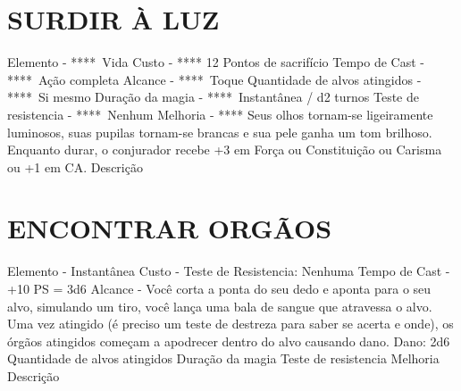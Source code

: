 \documentclass{article}%
\begin{document}
%
\section{SURDIR À LUZ}%
\label{sec:SURDIRLUZ}%
Elemento {-} ****~Vida\newline%
Custo {-} **** 12 Pontos de sacrifício\newline%
Tempo de Cast {-} ****~Ação completa\newline%
Alcance {-} ****~Toque\newline%
Quantidade de alvos atingidos {-} ****~Si mesmo\newline%
Duração da magia {-} ****~Instantânea / d2 turnos\newline%
Teste de resistencia {-} ****~Nenhum\newline%
Melhoria {-} **** Seus olhos tornam{-}se ligeiramente luminosos, suas pupilas tornam{-}se brancas e sua pele ganha um tom brilhoso. Enquanto durar, o conjurador recebe +3 em Força ou Constituição ou Carisma ou +1 em CA.\newline%
Descrição \newline%

%
\section{ENCONTRAR ORGÃOS}%
\label{sec:ENCONTRARORGOS}%
Elemento {-}  Instantânea\newline%
Custo {-} Teste de Resistencia: Nenhuma\newline%
Tempo de Cast {-}  +10 PS = 3d6\newline%
Alcance {-}  Você corta a ponta do seu dedo e aponta para o seu alvo, simulando um tiro, você lança uma bala de sangue que atravessa o alvo. Uma vez atingido (é preciso um teste de destreza para saber se acerta e onde), os órgãos atingidos começam a apodrecer dentro do alvo causando dano. Dano: 2d6\newline%
Quantidade de alvos atingidos \newline%
Duração da magia \newline%
Teste de resistencia \newline%
Melhoria \newline%
Descrição \newline%

%
\end{document}
